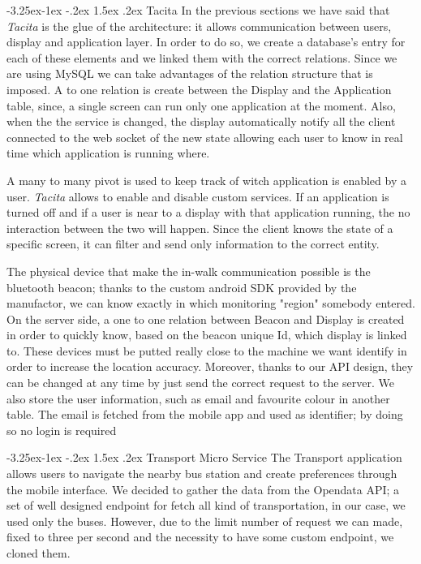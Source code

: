 \documentclass[]{usiinfbachelorproject}
\makeatletter
\newcommand\subsubsection{\@startsection{subsubsection}{3}{\z@}%
                {-3.25ex\@plus -1ex \@minus -.2ex}%
                {1.5ex \@plus .2ex}%
                {\normalfont\normalsize\bfseries}}
\makeatother
\begin{document}
\subsubsection{Tacita}
In the previous sections we have said that \emph{Tacita} is the glue of the architecture: it allows communication between users, display and application layer. In order to do so, we create a database's entry for each of these elements and we linked them with the correct relations. Since we are using MySQL we can take advantages of the relation structure that is imposed. A \one to one relation is create between the Display and the Application table, since, a single screen can run only one application at the moment. Also, when the the service is changed, the display automatically notify all the client connected to the web socket of the new state allowing each user to know in real time which application is running where.

A many to many pivot is used to keep track of witch application is enabled by a user. \emph{Tacita} allows to enable and disable custom services. If an application is turned off  and if a user is near to a display with that application running, the no interaction between the two will happen. Since the client knows the state of a specific screen, it can filter and send only information to the correct entity.

The physical device that make the in-walk communication possible is the bluetooth beacon; thanks to the custom android SDK provided by the manufactor, we can know exactly in which monitoring "region" somebody entered. On the server side, a one to one relation between Beacon and Display is created in order to quickly know, based on the beacon unique Id, which display is linked to. These devices must be putted really close to the machine we want identify in order to increase the location accuracy. Moreover, thanks to our API design, they can be changed at any time by just send the correct request to the server.
We also store the user information, such as email and favourite colour in another table. The email is fetched from the mobile app and used as identifier; by doing so no login is required 

\subsubsection{Transport Micro Service}
The Transport application allows users to navigate the nearby bus station and create preferences through the mobile interface. We decided to gather the data from the Opendata API; a set of well designed endpoint for fetch all kind of transportation, in our case, we used only the buses. However, due to the limit number of request we can made, fixed to three per second and the necessity to have some custom endpoint, we cloned them.
\end{document}
